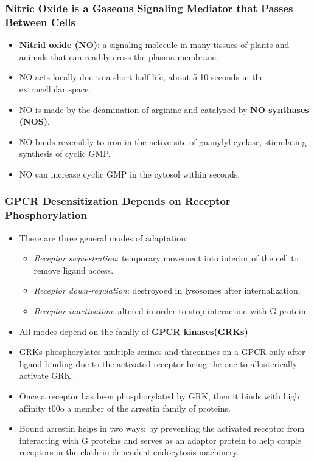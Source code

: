 \documentclass[12pt,a4paper]{article}
\begin{document}
\subsubsection{Nitric Oxide is a Gaseous Signaling Mediator that Passes Between Cells}
\begin{itemize}
    \item \textbf{Nitrid oxide (NO)}: a signaling molecule in many tissues of plants and animals that can readily cross the plasma membrane.
    \item NO acts locally due to a short half-life, about 5-10 seconds in the extracellular space.
    \item NO is made by the deamination of arginine and catalyzed by \textbf{NO synthases (NOS)}.
    \item NO binds reversibly to iron in the active site of guanylyl cyclase, stimulating synthesis of cyclic GMP.
    \item NO can increase cyclic GMP in the cytosol within seconds.
\end{itemize}

\subsubsection{GPCR Desensitization Depends on Receptor Phosphorylation}
\begin{itemize}
    \item There are three general modes of adaptation:
        \begin{itemize}
            \item \textit{Receptor sequestration}: temporary movement into interior of the cell to remove ligand access.
            \item \textit{Receptor down-regulation}: destroyoed in lysosomes after internalization.
            \item \textit{Receptor inactivation}: altered in order to stop interaction with G protein.
        \end{itemize}
    \item All modes depend on the family of \textbf{GPCR kinases(GRKs)}
    \item GRKs phosphorylates multiple serines and threonines on a GPCR only after ligand binding due to the activated receptor being the one to allosterically activate GRK.
    \item Once a receptor has been phosphorylated by GRK, then it binds with high affinity t00o a member of the arrestin family of proteins.
    \item Bound arrestin helps in two ways: by preventing the activated receptor from interacting with G proteins and serves as an adaptor protein to help couple receptors in the clathrin-dependent endocytosis machinery.
\end{itemize}
\end{document}
